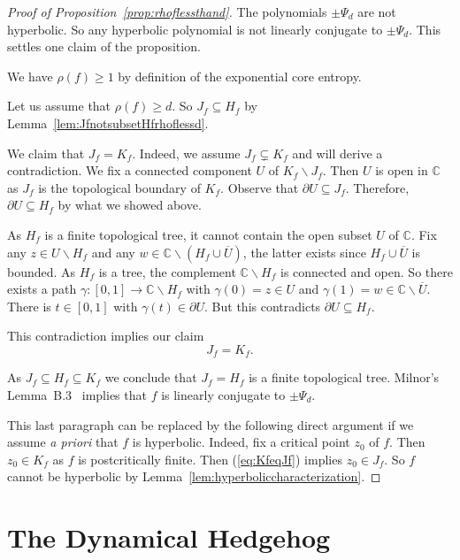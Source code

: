\documentclass[12pt,oneside,a4]{amsart}
\newcommand{\IC}{\mathbb{C}}
\numberwithin{maincounter}{section}
\numberwithin{equation}{section}
\renewcommand{\subset}{\subseteq}
\newcommand{\ssm}{\smallsetminus}
\begin{document}
\begin{proof}[Proof of Proposition~\ref{prop:rhoflessthand}]
  The polynomials $\pm \Psi_d$ are not hyperbolic. So any hyperbolic
  polynomial is not linearly conjugate to $\pm \Psi_d$. This settles
  one claim of the proposition.
  
  We have $\rho(f)\ge 1$ by definition of the exponential core entropy.

  Let us assume that $\rho(f) \ge d$. So $J_f \subset H_f$ by
  Lemma~\ref{lem:JfnotsubsetHfrhoflessd}. 

  We claim that $J_f = K_f$. Indeed, we assume $J_f \subsetneq K_f$
  and will derive a contradiction. We fix a connected component $U$
  of $K_f\ssm J_f$. Then $U$ is open in $\IC$ as $J_f$ is the
  topological boundary of $K_f$. Observe that $\partial U \subset J_f$.
  Therefore, $\partial U \subset H_f$ by what we showed above.
  
  As $H_f$ is a finite topological tree, it cannot contain the open
  subset $U$ of $\IC$.
  Fix any $z\in U\ssm H_f$ and any $w\in \IC\ssm (H_f\cup\overline{U})$, the
  latter exists since $H_f\cup \overline U$ is bounded.
  As $H_f$ is a tree, the complement $\IC\ssm H_f$ is connected and open.
  So there exists a path $\gamma\colon [0,1]\rightarrow\IC \ssm H_f$
  with $\gamma(0)=z\in U$ and $\gamma(1) = w\in \IC\ssm \overline U$.
  There is $t\in [0,1]$
  with $\gamma(t) \in \partial U$. But this contradicts $\partial
  U\subset H_f$.

  This contradiction implies our claim
  \begin{equation}
    \label{eq:KfeqJf}
    J_f = K_f.   
  \end{equation}

  As $J_f \subset H_f\subset K_f$ we conclude that $J_f = H_f$ is a finite
  topological tree. Milnor's Lemma~B.3~\cite{Milnor:pasting} implies
  that $f$ is linearly conjugate to $\pm \Psi_d$.

  This last paragraph can be replaced by the following direct
  argument if we assume \textit{a priori}
  that $f$ is hyperbolic. Indeed, 
  fix a critical point $z_0$ of $f$. Then $z_0\in K_f$ as $f$ is 
  postcritically finite. Then (\ref{eq:KfeqJf}) implies $z_0\in
  J_f$.
  So $f$ cannot be hyperbolic
  by Lemma~\ref{lem:hyperboliccharacterization}.
\end{proof}



\section{The Dynamical Hedgehog}
\label{sec:dynhedgehog}
\end{document}
